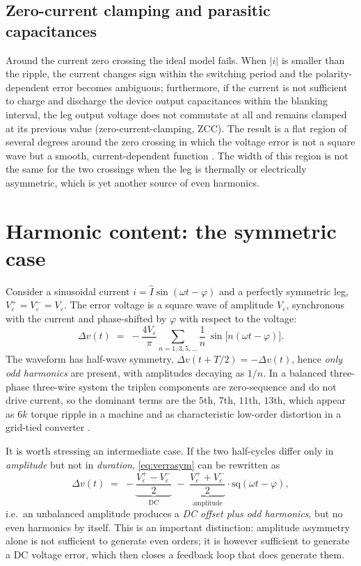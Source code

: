 \documentclass[11pt,a4paper]{article}
\begin{document}
\subsection{Zero-current clamping and parasitic capacitances}

Around the current zero crossing the ideal model fails. When $|i|$ is smaller than the
ripple, the current changes sign within the switching period and the polarity-dependent
error becomes ambiguous; furthermore, if the current is not sufficient to charge and
discharge the device output capacitances within the blanking interval, the leg output
voltage does not commutate at all and remains clamped at its previous value
(zero-current-clamping, ZCC). The result is a flat region of several degrees around the
zero crossing in which the voltage error is not a square wave but a smooth,
current-dependent function \cite{benbrahim2004,zhang2014,park2012}. The width of this
region is not the same for the two crossings when the leg is thermally or electrically
asymmetric, which is yet another source of even harmonics.

\section{Harmonic content: the symmetric case}

Consider a sinusoidal current $i=\hat{I}\sin(\omega t-\varphi)$ and a perfectly symmetric
leg, $V_{\!\varepsilon}^{+} = V_{\!\varepsilon}^{-} = V_{\!\varepsilon}$. The error
voltage is a square wave of amplitude $V_{\!\varepsilon}$, synchronous with the current
and phase-shifted by $\varphi$ with respect to the voltage:
\begin{equation}
\Delta v(t) \;=\; -\frac{4V_{\!\varepsilon}}{\pi}
\sum_{n=1,3,5,\dots} \frac{1}{n}\,\sin\!\big[n(\omega t-\varphi)\big].
\label{eq:square}
\end{equation}
The waveform has half-wave symmetry, $\Delta v(t+T/2) = -\Delta v(t)$, hence
\emph{only odd harmonics} are present, with amplitudes decaying as $1/n$. In a balanced
three-phase three-wire system the triplen components are zero-sequence and do not drive
current, so the dominant terms are the $5$th, $7$th, $11$th, $13$th, which appear as
$6k$ torque ripple in a machine and as characteristic low-order distortion in a grid-tied
converter \cite{jeong1991,choi1996,leggate1997,holmes2003}.

It is worth stressing an intermediate case. If the two half-cycles differ only in
\emph{amplitude} but not in \emph{duration}, \eqref{eq:verrasym} can be rewritten as
\begin{equation}
\Delta v(t) \;=\; -\underbrace{\frac{V_{\!\varepsilon}^{+}-V_{\!\varepsilon}^{-}}{2}}_{\text{DC}}
\;-\;\underbrace{\frac{V_{\!\varepsilon}^{+}+V_{\!\varepsilon}^{-}}{2}}_{\text{amplitude}}
\cdot \mathrm{sq}(\omega t - \varphi),
\label{eq:amplasym}
\end{equation}
i.e.\ an unbalanced amplitude produces a \emph{DC offset plus odd harmonics}, but no even
harmonics by itself. This is an important distinction: amplitude asymmetry alone is not
sufficient to generate even orders; it is however sufficient to generate a DC voltage
error, which then closes a feedback loop that does generate them.
\end{document}
